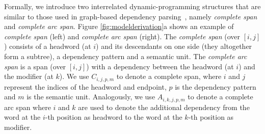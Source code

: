 Formally, we introduce two interrelated dynamic-programming structures that are similar to those used in graph-based dependency parsing~\cite{eisner2000bilexical,koo2010efficient,shi2017fast}, namely {\em complete span} and {\em complete arc span}. 
Figure \ref{fig:modelderivation}a shows an example of {\em complete span} (left) and {\em complete arc span} (right). 
The {\em complete span} (over $[i,j]$) consists of a headword (at $i$) and its descendants on one side (they altogether form a subtree), a dependency pattern and a semantic unit. 
The {\em complete arc span} is a span (over $[i,j]$) with a dependency between the headword (at $i$) and the modifier (at $k$). 
We use $C_{i,j,p,m}$ to denote a complete span, where $i$ and $j$ represent the indices of the headword and endpoint, $p$ is the dependency pattern and $m$ is the semantic unit. 
Analogously, we use $A_{i,k,j,p,m}$ to denote a complete arc span where $i$ and $k$ are used to denote the additional dependency from the word at the $i$-th position as headword to the word at the $k$-{th} position as modifier. 


